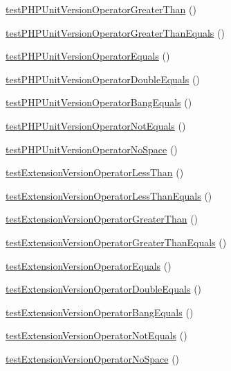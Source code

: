 \begin{DoxyCompactItemize}
\item 
\mbox{\hyperlink{class_requirements_test_ab5a7459470327c6baea6e48b3244f02b}{test\+P\+H\+P\+Unit\+Version\+Operator\+Greater\+Than}} ()
\item 
\mbox{\hyperlink{class_requirements_test_a0b21cf67e2ac5f94ce72a2f056e681e2}{test\+P\+H\+P\+Unit\+Version\+Operator\+Greater\+Than\+Equals}} ()
\item 
\mbox{\hyperlink{class_requirements_test_ab40e4045a03c96cb6ffe983d97c7d327}{test\+P\+H\+P\+Unit\+Version\+Operator\+Equals}} ()
\item 
\mbox{\hyperlink{class_requirements_test_a5609392dc49635a9c6de8930abcb7cd4}{test\+P\+H\+P\+Unit\+Version\+Operator\+Double\+Equals}} ()
\item 
\mbox{\hyperlink{class_requirements_test_a77de16ea341491e3a10adf134c8c5ae0}{test\+P\+H\+P\+Unit\+Version\+Operator\+Bang\+Equals}} ()
\item 
\mbox{\hyperlink{class_requirements_test_a8764d888b289b4ef7d079bb65bfc0eb4}{test\+P\+H\+P\+Unit\+Version\+Operator\+Not\+Equals}} ()
\item 
\mbox{\hyperlink{class_requirements_test_a97d90877c22b78858c4c1e574a17afcd}{test\+P\+H\+P\+Unit\+Version\+Operator\+No\+Space}} ()
\item 
\mbox{\hyperlink{class_requirements_test_acebb9bad68459d71fd3b06b8f487eeb7}{test\+Extension\+Version\+Operator\+Less\+Than}} ()
\item 
\mbox{\hyperlink{class_requirements_test_a92c8e0c8c06e7d554255f5b57cd1cc5b}{test\+Extension\+Version\+Operator\+Less\+Than\+Equals}} ()
\item 
\mbox{\hyperlink{class_requirements_test_a16d2b756061abf4373660e4cab904115}{test\+Extension\+Version\+Operator\+Greater\+Than}} ()
\item 
\mbox{\hyperlink{class_requirements_test_a920b0a767cebf56b4b293656fe900328}{test\+Extension\+Version\+Operator\+Greater\+Than\+Equals}} ()
\item 
\mbox{\hyperlink{class_requirements_test_ae969d8a4bfc447c2c2cef951e7663947}{test\+Extension\+Version\+Operator\+Equals}} ()
\item 
\mbox{\hyperlink{class_requirements_test_a02790f66fb537898ee441cfbb2257d14}{test\+Extension\+Version\+Operator\+Double\+Equals}} ()
\item 
\mbox{\hyperlink{class_requirements_test_a76ef42bfbb9b908d57459ff1d22370d9}{test\+Extension\+Version\+Operator\+Bang\+Equals}} ()
\item 
\mbox{\hyperlink{class_requirements_test_ab3dbb550ac3e6c2d4876f0c8a2398161}{test\+Extension\+Version\+Operator\+Not\+Equals}} ()
\item 
\mbox{\hyperlink{class_requirements_test_a9785191034ab0e1b1a693a0557a01cc6}{test\+Extension\+Version\+Operator\+No\+Space}} ()
\end{DoxyCompactItemize}
